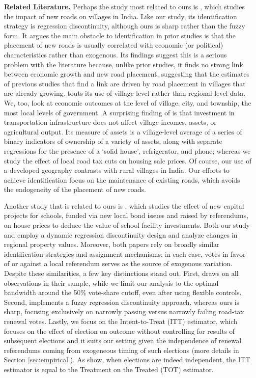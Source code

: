 {\bf Related Literature.} Perhaps the study most related to ours is \cite{asher2020}, which studies the impact of new roads on villages in India. Like our study, its identification strategy is regression discontinuity, although ours is sharp rather than the fuzzy form.  It argues the main obstacle to identification in prior studies is that the placement of new roads is usually correlated with economic (or political) characteristics rather than exogenous. Its findings suggest this is a serious problem with the literature because, unlike prior studies, it finds no strong link between economic growth and new road placement, suggesting that the estimates of previous studies that find a link are driven by road placement in villages that are already growing. \cite{asher2020} touts its use of village-level rather than regional-level data.  We, too, look at economic outcomes at the level of village, city, and township, the most local levels of government.  A surprising finding of \cite{asher2020} is that investment in transportation infrastructure does not affect village incomes, assets, or agricultural output.  Its measure of assets is a village-level average of a series of binary indicators of ownership of a variety of assets, along with separate regressions for the presence of a ‘solid house’, refrigerator, and phone; whereas we study the effect of local road tax cuts on housing sale prices.  Of course, our use of a developed geography contrasts with rural villages in India.  Our efforts to achieve identification focus on the maintenance of existing roads, which avoids the endogeneity of the placement of new roads.

Another study that is related to ours is \cite{cellini2010value}, which studies the effect of new capital projects for schools, funded via new local bond issues and raised by referendums, on house prices to deduce the value of school facility investments. Both our study and \cite{cellini2010value} employ a dynamic regression discontinuity design and analyze changes in regional property values. Moreover, both papers rely on broadly similar identification strategies and assignment mechanisms: in each case, votes in favor of or against a local referendum serves as the source of exogenous variation. Despite these similarities, a few key distinctions stand out. First, \cite{cellini2010value} draws on all observations in their sample, while we limit our analysis to the optimal bandwidth around the 50\% vote-share cutoff, even after using flexible controls. Second, \cite{cellini2010value} implements a fuzzy regression discontinuity approach, whereas ours is sharp, focusing exclusively on narrowly passing versus narrowly failing road-tax renewal votes. Lastly, we focus on the Intent-to-Treat (ITT) estimator, which focuses on the effect of election on outcome without controlling for results of subsequent elections and it suits our setting given the independence of renewal referendums coming from exogeneous timing of such elections (more details in Section \ref{sec:empirical}). As \cite{cellini2010value} show, when elections are indeed independent, the ITT estimator is equal to the Treatment on the Treated (TOT) estimator. 

